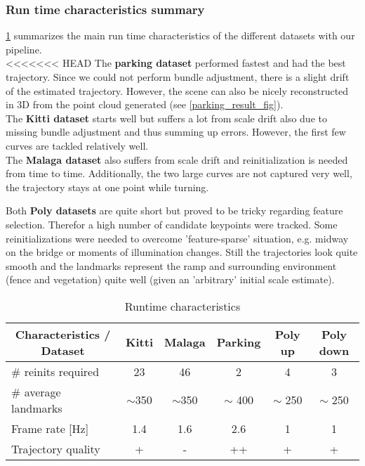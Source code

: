\subsubsection{Run time characteristics summary}
\cref{runtime_table} summarizes the main run time characteristics of the different datasets with our pipeline.\\

<<<<<<< HEAD
The \textbf{parking dataset} performed fastest and had the best trajectory. Since we could not perform bundle adjustment, there is a slight drift of the estimated trajectory. However, the scene can also be nicely reconstructed in 3D from the point cloud generated (see \cref{parking_result_fig}).\\

The \textbf{Kitti dataset} starts well but suffers a lot from scale drift also due to missing bundle adjustment and thus summing up errors. However, the first few curves are tackled relatively well.\\

The \textbf{Malaga dataset} also suffers from scale drift and reinitialization is needed from time to time. Additionally, the two large curves are not captured very well, the trajectory stays at one point while turning.

Both \textbf{Poly datasets} are quite short but proved to be tricky regarding feature selection. Therefor a high number of candidate keypoints were tracked. Some reinitializations were needed to overcome 'feature-sparse' situation, e.g. midway on the bridge or moments of illumination changes. Still the trajectories look quite smooth and the landmarks represent the ramp and surrounding environment (fence and vegetation) quite well (given an 'arbitrary' initial scale estimate).

\begin{table}[h!!]
	\centering
	\begin{tabular}{|l|c|c|c|c|c|}
	\hline
	\multicolumn{1}{|c|}{\textbf{Characteristics / Dataset}} & \textbf{Kitti} & \textbf{Malaga} & \textbf{Parking} & \textbf{Poly up} & \textbf{Poly down} \\ \hline
	\# reinits required                                      & 23             &  46               & 2                & 4 & 3  \\ \hline
	\# average landmarks                                     & $\sim$350      &  $\sim$350         & $\sim$ 400       & $\sim$ 250 & $\sim$ 250 \\ \hline
	Frame rate {[}Hz{]}                                      & 1.4            &  1.6               & 2.6              & 1 & 1 \\ \hline
	Trajectory quality                                       & +              &  -               & ++               & + & + \\ \hline
	\end{tabular}
	\caption{Runtime characteristics}
	\label{runtime_table}
\end{table}

